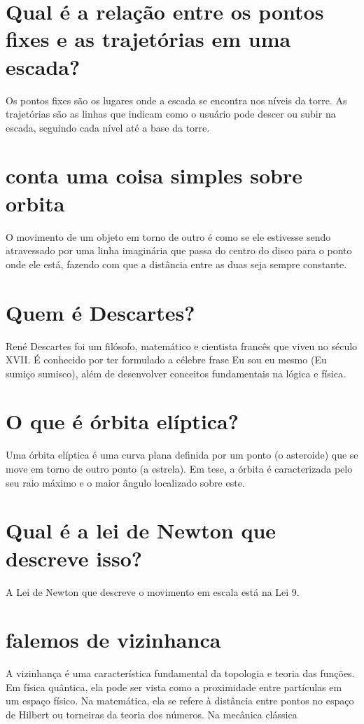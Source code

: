 \documentclass[11pt,a4paper]{article}
\begin{document}
\section{Qual é a relação entre os pontos fixes e as trajetórias em uma escada?}
Os pontos fixes são os lugares onde a escada se encontra nos níveis da torre. As trajetórias são as linhas que indicam como o usuário pode descer ou subir na escada, seguindo cada nível até a base da torre.

\section{conta uma coisa simples sobre orbita}
O movimento de um objeto em torno de outro é como se ele estivesse sendo atravessado por uma linha imaginária que passa do centro do disco para o ponto onde ele está, fazendo com que a distância entre as duas seja sempre constante.

\section{Quem é Descartes?}
René Descartes foi um filósofo, matemático e cientista francês que viveu no século XVII. É conhecido por ter formulado a célebre frase Eu sou eu mesmo (Eu sumiço sumisco), além de desenvolver conceitos fundamentais na lógica e física.

\section{O que é órbita elíptica?}
Uma órbita elíptica é uma curva plana definida por um ponto (o asteroide) que se move em torno de outro ponto (a estrela). Em tese, a órbita é caracterizada pelo seu raio máximo e o maior ângulo localizado sobre este.

\section{Qual é a lei de Newton que descreve isso?}
A Lei de Newton que descreve o movimento em escala está na Lei 9.

\section{falemos de vizinhanca}
A vizinhança é uma característica fundamental da topologia e teoria das funções. Em física quântica, ela pode ser vista como a proximidade entre partículas em um espaço físico. Na matemática, ela se refere à distância entre pontos no espaço de Hilbert ou torneiras da teoria dos números. Na mecânica clássica
\end{document}
